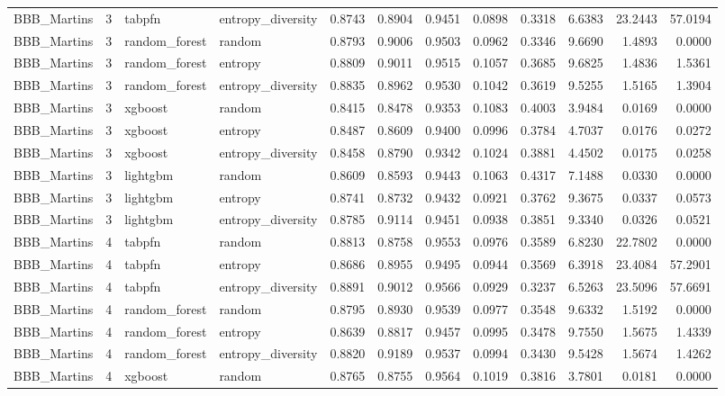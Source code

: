 \begin{tabular}{lrllrrrrrrrr}
BBB_Martins & 3 & tabpfn & entropy_diversity & 0.8743 & 0.8904 & 0.9451 & 0.0898 & 0.3318 & 6.6383 & 23.2443 & 57.0194 \\
BBB_Martins & 3 & random_forest & random & 0.8793 & 0.9006 & 0.9503 & 0.0962 & 0.3346 & 9.6690 & 1.4893 & 0.0000 \\
BBB_Martins & 3 & random_forest & entropy & 0.8809 & 0.9011 & 0.9515 & 0.1057 & 0.3685 & 9.6825 & 1.4836 & 1.5361 \\
BBB_Martins & 3 & random_forest & entropy_diversity & 0.8835 & 0.8962 & 0.9530 & 0.1042 & 0.3619 & 9.5255 & 1.5165 & 1.3904 \\
BBB_Martins & 3 & xgboost & random & 0.8415 & 0.8478 & 0.9353 & 0.1083 & 0.4003 & 3.9484 & 0.0169 & 0.0000 \\
BBB_Martins & 3 & xgboost & entropy & 0.8487 & 0.8609 & 0.9400 & 0.0996 & 0.3784 & 4.7037 & 0.0176 & 0.0272 \\
BBB_Martins & 3 & xgboost & entropy_diversity & 0.8458 & 0.8790 & 0.9342 & 0.1024 & 0.3881 & 4.4502 & 0.0175 & 0.0258 \\
BBB_Martins & 3 & lightgbm & random & 0.8609 & 0.8593 & 0.9443 & 0.1063 & 0.4317 & 7.1488 & 0.0330 & 0.0000 \\
BBB_Martins & 3 & lightgbm & entropy & 0.8741 & 0.8732 & 0.9432 & 0.0921 & 0.3762 & 9.3675 & 0.0337 & 0.0573 \\
BBB_Martins & 3 & lightgbm & entropy_diversity & 0.8785 & 0.9114 & 0.9451 & 0.0938 & 0.3851 & 9.3340 & 0.0326 & 0.0521 \\
BBB_Martins & 4 & tabpfn & random & 0.8813 & 0.8758 & 0.9553 & 0.0976 & 0.3589 & 6.8230 & 22.7802 & 0.0000 \\
BBB_Martins & 4 & tabpfn & entropy & 0.8686 & 0.8955 & 0.9495 & 0.0944 & 0.3569 & 6.3918 & 23.4084 & 57.2901 \\
BBB_Martins & 4 & tabpfn & entropy_diversity & 0.8891 & 0.9012 & 0.9566 & 0.0929 & 0.3237 & 6.5263 & 23.5096 & 57.6691 \\
BBB_Martins & 4 & random_forest & random & 0.8795 & 0.8930 & 0.9539 & 0.0977 & 0.3548 & 9.6332 & 1.5192 & 0.0000 \\
BBB_Martins & 4 & random_forest & entropy & 0.8639 & 0.8817 & 0.9457 & 0.0995 & 0.3478 & 9.7550 & 1.5675 & 1.4339 \\
BBB_Martins & 4 & random_forest & entropy_diversity & 0.8820 & 0.9189 & 0.9537 & 0.0994 & 0.3430 & 9.5428 & 1.5674 & 1.4262 \\
BBB_Martins & 4 & xgboost & random & 0.8765 & 0.8755 & 0.9564 & 0.1019 & 0.3816 & 3.7801 & 0.0181 & 0.0000 \\

\end{tabular}
